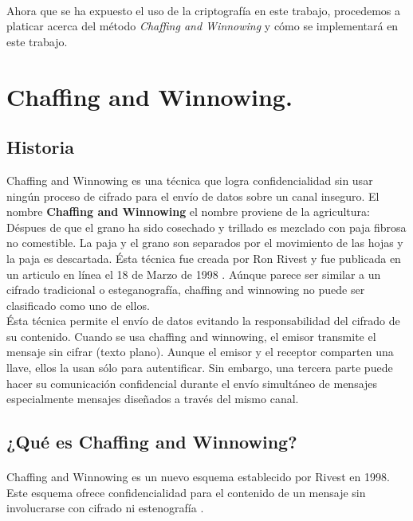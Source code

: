 \documentclass[12pt, a4paper, titlepage]{report}
\begin{document}
	    \paragraph{}
	    Ahora que se ha expuesto el uso de la criptografía en este trabajo, procedemos a platicar acerca del método \textit{Chaffing and Winnowing} y cómo se implementará en este trabajo.
	   
	    \section{Chaffing and Winnowing.}
	    \subsection{Historia}
	    Chaffing and Winnowing es una técnica que logra confidencialidad sin usar ning\'un proceso de cifrado para el env\'io de datos sobre un canal inseguro. El nombre \textbf{Chaffing and Winnowing} el nombre proviene de la agricultura: D\'espues de que el grano ha sido cosechado y trillado es mezclado con paja fibrosa no comestible. La paja y el grano son separados por el movimiento de las hojas y la paja es descartada.
	    \'Esta t\'ecnica fue creada por Ron Rivest y fue publicada en un articulo en l\'inea el 18 de Marzo de 1998 \cite{refCryptohraphyWithoutEncryption}.
	    A\'unque parece ser similar a un cifrado tradicional o esteganograf\'ia, chaffing and winnowing no puede ser clasificado como uno de ellos.\\
	    \'Esta t\'ecnica permite el env\'io de datos evitando la responsabilidad del cifrado de su contenido. Cuando se usa chaffing and winnowing, el emisor transmite el mensaje sin cifrar (texto plano). Aunque el emisor y el receptor comparten una llave, ellos la usan s\'olo para autentificar. Sin embargo, una tercera parte puede hacer su comunicaci\'on confidencial durante el env\'io simult\'aneo de mensajes especialmente mensajes diseñados a través del mismo canal.
	    
	    \subsection{¿Qu\'e es Chaffing and Winnowing?}
	    
	    \paragraph{}
        Chaffing and Winnowing es un nuevo esquema establecido por Rivest en 1998. Este esquema ofrece confidencialidad para el contenido de un mensaje sin involucrarse con cifrado ni estenografía \cite{refCriptografia}.
	    
\end{document}
